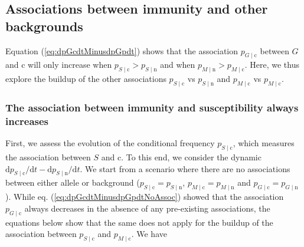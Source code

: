 \documentclass{article}
\newcommand{\badFGE}{M}
\newcommand{\goodFGE}{G}
\newcommand{\sensitive}{\mathrm{n}}
\newcommand{\immune}{\mathrm{c}}
\begin{document}
\subsection{Associations between immunity and other backgrounds}

Equation (\ref{eq:dpGcdtMinusdpGpdt}) shows that the association $p_{\goodFGE \mid \immune}$ between $\goodFGE$ and $\immune$  will only increase when $p_{S \mid \immune} > p_{S \mid \sensitive}$ and when  $p_{\badFGE \mid \sensitive} > p_{\badFGE \mid \immune}$. Here, we thus explore the buildup of the other associations $p_{S \mid \immune}$ vs $p_{S \mid \sensitive}$ and  $p_{\badFGE \mid \immune}$ vs $p_{\badFGE \mid \immune}$. 

\subsubsection{The association between immunity and susceptibility always increases}
First, we assess the evolution of the conditional frequency $p_{S\mid \immune}$, which measures the association between $S$ and $\immune$. To this end, we consider the dynamic $\mathrm{d} p_{S\mid \immune}/ \mathrm{d} t - \mathrm{d} p_{S\mid \sensitive}/ \mathrm{d} t$. We start from a scenario where there are no associations between either allele or background  ($p_{S \mid \immune} = p_{S \mid \sensitive}$, $p_{\badFGE \mid \immune} = p_{\badFGE \mid \sensitive}$ and $p_{\goodFGE \mid \immune} = p_{\goodFGE \mid \sensitive}$). While eq. (\ref{eq:dpGcdtMinusdpGpdtNoAssoc}) showed that the association $p_{\goodFGE \mid \immune}$ always decreases in the absence of any pre-existing associations, the equations below show that the same does not apply for the buildup of the association between $p_{S \mid \immune}$ and $p_{\badFGE \mid \immune}$.
We have
\end{document}

